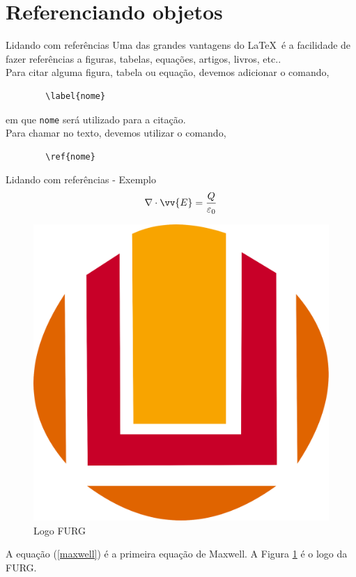 \documentclass[c]{beamer}
\begin{document}
{\section{Referenciando objetos}



\begin{frame}[fragile]{\sc Lidando com referências}
	Uma das grandes vantagens do \LaTeX \ é a facilidade de fazer {\color{blue} referências} a figuras, tabelas, equações, artigos, livros, etc.. 
	\\
	Para {\color{blue} citar} alguma {\color{blue} figura}, {\color{blue} tabela} ou {\color{blue} equação}, devemos adicionar o comando,
	\begin{verbatim}
		\label{nome}
	\end{verbatim}
	em que \texttt{nome} será utilizado para a citação.
	\\
	Para chamar no texto, devemos utilizar o comando, 
	\begin{verbatim}
		\ref{nome}
	\end{verbatim}
	
\end{frame}

\begin{frame}{\sc Lidando com referências - Exemplo}	
	\begin{equation}
	\nabla \cdot \vv{E} = \frac{Q}{\varepsilon_0} \label{maxwell}
	\end{equation}	
	\begin{figure}[h]
		\centering
		\includegraphics[scale=0.05]{images/furg.png}
		\caption{Logo FURG}
		\label{furg}
	\end{figure}
	A equação (\ref{maxwell}) é a primeira equação de Maxwell. A {\sc Figura} \ref{furg} é o logo da FURG.
\end{frame}

}
\end{document}
